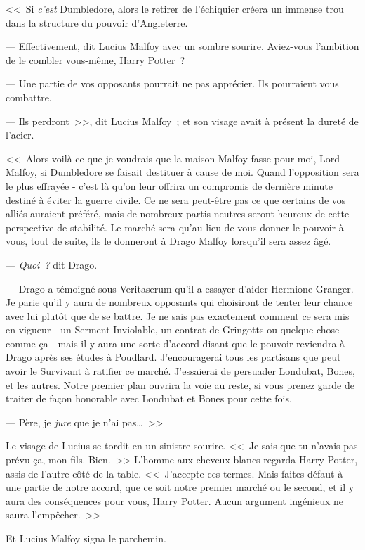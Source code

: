 <<~Si \emph{c'est} Dumbledore, alors le retirer de l'échiquier créera un immense trou dans la structure du pouvoir d'Angleterre.

--- Effectivement, dit Lucius Malfoy avec un sombre sourire. Aviez-vous l'ambition de le combler vous-même, Harry Potter~?

--- Une partie de vos opposants pourrait ne pas apprécier. Ils pourraient vous combattre.

--- Ils perdront~>>, dit Lucius Malfoy~; et son visage avait à présent la dureté de l'acier.

<<~Alors voilà ce que je voudrais que la maison Malfoy fasse pour moi, Lord Malfoy, si Dumbledore se faisait destituer à cause de moi. Quand l'opposition sera le plus effrayée - c'est là qu'on leur offrira un compromis de dernière minute destiné à éviter la guerre civile. Ce ne sera peut-être pas ce que certains de vos alliés auraient préféré, mais de nombreux partis neutres seront heureux de cette perspective de stabilité. Le marché sera qu'au lieu de vous donner le pouvoir à vous, tout de suite, ils le donneront à Drago Malfoy lorsqu'il sera assez âgé.

--- \emph{Quoi~?} dit Drago.

--- Drago a témoigné sous Veritaserum qu'il a essayer d'aider Hermione Granger. Je parie qu'il y aura de nombreux opposants qui choisiront de tenter leur chance avec lui plutôt que de se battre. Je ne sais pas exactement comment ce sera mis en vigueur - un Serment Inviolable, un contrat de Gringotts ou quelque chose comme ça - mais il y aura une sorte d'accord disant que le pouvoir reviendra à Drago après ses études à Poudlard. J'encouragerai tous les partisans que peut avoir le Survivant à ratifier ce marché. J'essaierai de persuader Londubat, Bones, et les autres. Notre premier plan ouvrira la voie au reste, si vous prenez garde de traiter de façon honorable avec Londubat et Bones pour cette fois.

--- Père, je \emph{jure} que je n'ai pas…~>>

Le visage de Lucius se tordit en un sinistre sourire. <<~Je sais que tu n'avais pas prévu ça, mon fils. Bien.~>> L'homme aux cheveux blancs regarda Harry Potter, assis de l'autre côté de la table. <<~J'accepte ces termes. Mais faites défaut à une partie de notre accord, que ce soit notre premier marché ou le second, et il y aura des conséquences pour vous, Harry Potter. Aucun argument ingénieux ne saura l'empêcher.~>>

Et Lucius Malfoy signa le parchemin.

